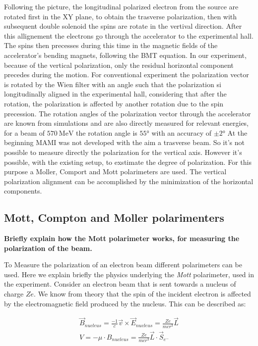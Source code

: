 Following the picture, the longitudinal polarized electron from the source are rotated first in the XY plane, to obtain the trasverse polarization, then with subsequent double solenoid the spins are rotate in the vertival direction. 
After this allignement the electrons go through the accelerator to the experimental hall. The spins then precesses during this time in the magnetic fields of the accelerator's bending magnets, following the BMT equation.
In our experiment, because of the vertical polarization, only the residual horizontal component precedes during the motion. For conventional experiment the polarization vector is rotated by the Wien filter with an angle such that the polarization si longitudinally aligned in the experimental hall, considering that after the rotation, the polarization is affected by another rotation due to the spin precession. The rotation angles of the polarization vector through the accelerator are known from simulations and are also directly measured for relevant energies, for a beam of $\SI{570}{\mega \electronvolt}$ the rotation angle is $\ang{55}$ with an accuracy of $\pm \ang{2}$
At the beginning MAMI was not developed with the aim a trasverse beam. So it's not possible to measure directly the polarization for the vertical axis. However it's possible, with the existing setup, to exstimate the degree of polarization. For this purpose a Moller, Comport and Mott polarimeters are used. The vertical polarization alignment can be accomplished by the minimization of the horizontal components. 


\subsection{Mott, Compton and Moller polarimenters}
{\bfseries Briefly explain how the Mott polarimeter works, for measuring the polarization of the beam.}

To Measure the polarization of an electron beam different polarimeters can be used. Here we explain briefly the physics underlying the \textit{Mott} polarimeter, used in the experiment.
Consider an electron beam that is sent towards a nucleus of charge $Ze$. We know from theory that the spin of the incident electron is affected by the electromagnetic field produced by the nucleus. This can be described as:

\begin{align*}
\vec{B}_{nucleus} = \frac{-1}{c} \vec{v} \times \vec{E}_{nucleus} = \frac{Ze}{mc r^{3}} \vec{L} \\
V = - \mu \cdot B_{nucleus} = \frac{Ze}{mcr^{3}} \vec{L} \cdot \vec{S}_{e^{-}}
\end{align*}

